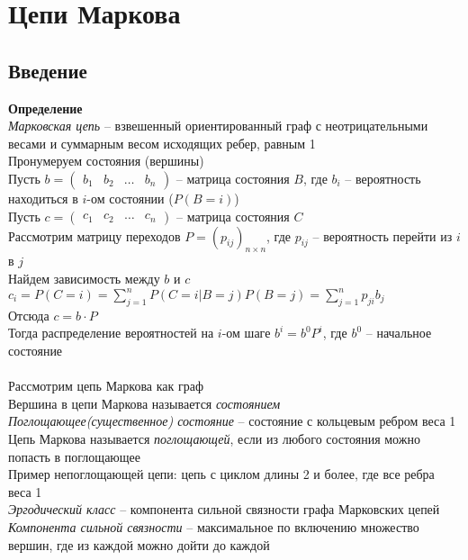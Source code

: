 \documentclass[12pt]{article}
\begin{document}
\section{Цепи Маркова}
\subsection{Введение}
\textbf{Определение}\\
\textit{Марковская цепь} -- взвешенный ориентированный граф с неотрицательными весами и суммарным весом исходящих ребер, равным 1\\
Пронумеруем состояния (вершины)\\
Пусть $b = \begin{pmatrix} b_1 & b_2 & \ldots & b_n \end{pmatrix}$ -- матрица состояния $B$, где $b_i$ -- вероятность находиться в $i$-ом состоянии ($P(B = i)$)\\
Пусть $c = \begin{pmatrix} c_1 & c_2 & \ldots & c_n \end{pmatrix}$ -- матрица состояния $C$\\
Рассмотрим матрицу переходов $P=(p_{ij})_{n\times n}$, где $p_{ij}$ -- вероятность перейти из $i$ в $j$\\
Найдем зависимость между $b$ и $c$\\
$c_i = P(C = i) = \sum_{j=1}^n P(C=i|B=j)P(B=j) = \sum_{j=1}^n p_{ji}b_j$\\
Отсюда $c = b \cdot P$\\
Тогда распределение вероятностей на $i$-ом шаге $b^i = b^0 P^i$, где $b^0$ -- начальное состояние\\\\
Рассмотрим цепь Маркова как граф\\
Вершина в цепи Маркова называется \textit{состоянием}\\
\textit{Поглощающее(существенное) состояние} -- состояние с кольцевым ребром веса 1\\
Цепь Маркова называется \textit{поглощающей}, если из любого состояния можно попасть в поглощающее\\
Пример непоглощающей цепи: цепь с циклом длины 2 и более, где все ребра веса 1\\
\textit{Эргодический класс} -- компонента сильной связности графа Марковских цепей\\
\textit{Компонента сильной связности} -- максимальное по включению множество вершин, где из каждой можно дойти до каждой\\
\end{document}
